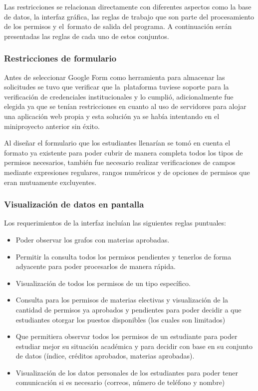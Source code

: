 \documentclass[]{article}
\begin{document}
Las restricciones se relacionan directamente con diferentes aspectos
como la base de datos, la interfaz gráfica, las reglas de trabajo que
son parte del procesamiento de los permisos y el~formato de salida del
programa. A continuación serán presentadas las reglas de cada uno de
estos conjuntos.

\subsubsection{Restricciones de
formulario}\label{restricciones-de-formulario}

Antes de seleccionar Google Form como herramienta para almacenar las
solicitudes se tuvo que verificar que la~plataforma tuviese soporte para
la verificación de credenciales institucionales y lo cumplió,
adicionalmente fue elegida ya que se tenían restricciones en cuanto al
uso de servidores para alojar una aplicación web propia y esta solución
ya se había intentando en el miniproyecto anterior sin éxito.

Al diseñar el formulario que los estudiantes llenarían se tomó en cuenta
el formato ya existente para poder cubrir de manera completa todos los
tipos de permisos necesarios, también fue necesario realizar
verificaciones de campos mediante expresiones regulares, rangos
numéricos y de opciones de permisos que eran mutuamente excluyentes.

\subsubsection{Visualización de datos en
pantalla}\label{visualizaciuxf3n-de-datos-en-pantalla}

Los requerimientos de la interfaz incluían las siguientes reglas
puntuales:

\begin{itemize}
\itemsep1pt\parskip0pt
\item
  Poder observar los grafos con materias aprobadas.
\item
  Permitir la consulta todos los permisos pendientes y tenerlos de forma
  adyacente para poder procesarlos de manera rápida.
\item
  Visualización de todos los permisos de un tipo específico.
\item
  Consulta para los permisos de materias electivas y visualización de la
  cantidad de permisos ya aprobados y pendientes para poder decidir a
  que estudiantes otorgar los puestos disponibles (los cuales son
  limitados)
\item
  Que permitiera observar todos los permisos de un estudiante para poder
  estudiar mejor su situación académica y para decidir con base en su
  conjunto de datos (índice, créditos aprobados, materias aprobadas).
\item
  Visualización de los datos personales de los estudiantes para poder
  tener comunicación si es necesario (correos, número de teléfono y
  nombre)
\end{itemize}
\end{document}
